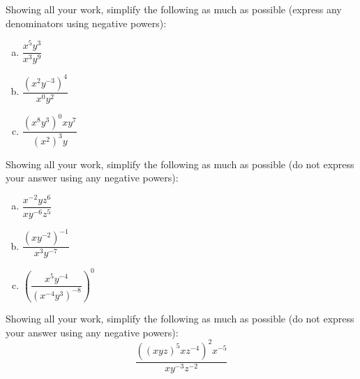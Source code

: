 \documentclass[11pt,letterpaper]{article}
\begin{document}

 Showing all your work, simplify the following as much as possible (express any denominators using negative powers):
	\begin{enumerate}[(a)]
	\item $\dfrac{x^5 y^3}{x^3 y^9}$
	\item $\dfrac{(x^2 y^{-3})^4}{x^0 y^2}$
	\item $\dfrac{(x^8 y^3)^0 x y^7}{(x^2)^3 y}$
	\end{enumerate}



\newpage



 Showing all your work, simplify the following as much as possible (do not express your answer using any negative powers): 
	\begin{enumerate}[(a)]
	\item $\dfrac{x^{-2} y z^6}{x y^{-6} z^5}$
	\item $\dfrac{(x y^{-2})^{-1}}{x^3 y^{-7}}$
	\item $\left( \dfrac{x^5 y^{-4}}{(x^{-4} y^3)^{-8}} \right)^0$
	\end{enumerate}



\newpage



 Showing all your work, simplify the following as much as possible (do not express your answer using any negative powers): 
	\[
	\dfrac{\left( (x y z)^5 x z^{-4} \right)^2 x^{-5}}{x y^{-3} z^{-2}}
	\]
\end{document}
